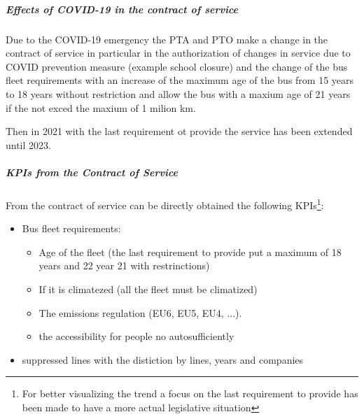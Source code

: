 \subparagraph{Effects of COVID-19 in the contract of service}
Due to the COVID-19 emergency the PTA and PTO make a change in the contract of service in particular in the authorization of changes in service due to COVID prevention measure (example school closure) and the change of the bus fleet requirements with an increase of the maximum age of the bus from 15 years to 18 years without restriction and allow the bus with a maxium age of 21 years if the not exced the maxium of 1 milion km.

Then in 2021 with the last requirement ot provide the service has been extended until 2023.

\subparagraph{KPIs from the Contract of Service}
From the contract of service can be directly obtained the following KPIs\footnote{For better visualizing the trend a focus on the last requirement to provide has been made to have a more actual legislative situation}:
\begin{itemize}
    \item Bus fleet requirements:
    \begin{itemize}
        \item Age of the fleet (the last requirement to provide put a maximum of 18 years and 22 year 21 with restrinctions)
        \item If it is climatezed (all the fleet must be climatized)
        \item The emissions regulation (EU6, EU5, EU4, ...).
        \item the accessibility for people no autosufficiently
    \end{itemize}
    \item suppressed lines with the distiction by lines, years and companies
\end{itemize}


